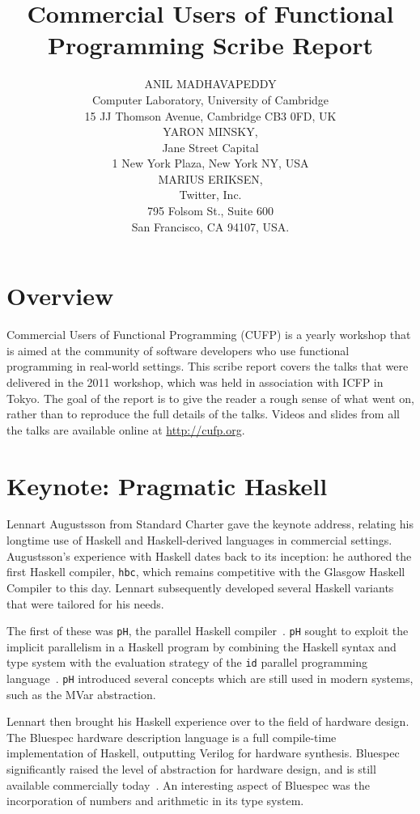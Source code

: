 \documentclass{jfp1}
\title[Commercial Users of Functional Programming 2011]
      {Commercial Users of Functional Programming Scribe Report}
\author[Anil Madhavapeddy, Yaron Minsky and Marius Eriksen]
       {ANIL MADHAVAPEDDY\\
        Computer Laboratory, University of Cambridge\\ 
        15 JJ Thomson Avenue, Cambridge CB3 0FD, UK\\
 YARON MINSKY,\\
        Jane Street Capital\\
        1 New York Plaza, New York NY, USA\\ 
 MARIUS ERIKSEN,\\
        Twitter, Inc.\\
        795 Folsom St., Suite 600\\
        San Francisco, CA 94107, USA.
        }
\begin{document}
\label{firstpage}
\maketitle

\section{Overview}

Commercial Users of Functional Programming (CUFP) is a yearly workshop
that is aimed at the community of software developers who use functional
programming in real-world settings.  This scribe report covers the talks
that were delivered in the 2011 workshop, which was held in association
with ICFP in Tokyo.  The goal of the report is to give the reader
a rough sense of what went on, rather than to reproduce the full details
of the talks.  Videos and slides from all the talks are available online at \url{http://cufp.org}.

\section{Keynote: Pragmatic Haskell}

Lennart Augustsson from Standard Charter gave the keynote address,
relating his longtime use of Haskell and Haskell-derived languages in
commercial settings.  Augustsson's experience with Haskell dates back to
its inception: he authored the first Haskell compiler, {\tt hbc}, which
remains competitive with the Glasgow Haskell Compiler to this
day. Lennart subsequently developed several Haskell variants that were
tailored for his needs.

The first of these was {\tt pH}, the parallel Haskell compiler~\cite{Aditya95semanticsof}. {\tt pH} sought to exploit the implicit parallelism in a Haskell program by combining the Haskell syntax and type system with the evaluation strategy of the {\tt id} parallel programming language~\cite{arvindid}.  {\tt pH} introduced several concepts which are still used in modern systems, such as the MVar abstraction.

Lennart then brought his Haskell experience over to the field of
hardware design.  The Bluespec hardware description language is a full
compile-time implementation of Haskell, outputting Verilog for hardware
synthesis.  Bluespec significantly raised the level of abstraction for
hardware design, and is still available commercially
today~\cite{Nikhil:2008:BLU:1862867.1862868}.  An interesting aspect of Bluespec was the
incorporation of numbers and arithmetic in its type system.
\end{document}
